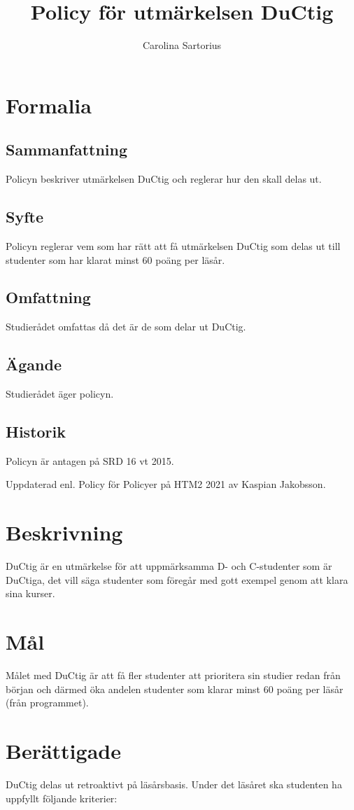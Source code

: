 \documentclass{dsekprotokoll}
\title{Policy för utmärkelsen DuCtig}
\author{Carolina Sartorius}
\begin{document}
\maketitle

\section{Formalia}
\subsection{Sammanfattning}
Policyn beskriver utmärkelsen DuCtig och reglerar hur den skall delas ut.
\subsection{Syfte}
Policyn reglerar vem som har rätt att få utmärkelsen DuCtig som delas ut till studenter som har klarat minst 60 poäng per läsår.
\subsection{Omfattning}
Studierådet omfattas då det är de som delar ut DuCtig.
\subsection{Ägande}
Studierådet äger policyn.
\subsection{Historik}
Policyn är antagen på SRD 16 vt 2015.

Uppdaterad enl. Policy för Policyer på HTM2 2021 av Kaspian Jakobsson.

\section{Beskrivning}
DuCtig är en utmärkelse för att uppmärksamma D- och C-studenter som är DuCtiga, det vill
säga studenter som föregår med gott exempel genom att klara sina kurser.

\section{Mål}
Målet med DuCtig är att få fler studenter att prioritera sin studier redan från början och därmed
öka andelen studenter som klarar minst 60 poäng per läsår (från programmet).

\section{Berättigade}
DuCtig delas ut retroaktivt på läsårsbasis. Under det läsåret ska studenten ha uppfyllt följande
kriterier:
\end{document}
